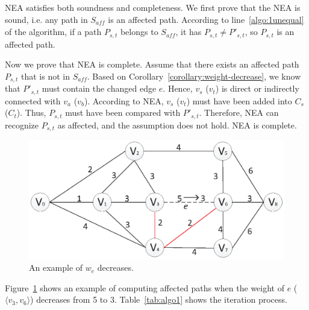 NEA satisfies both soundness and completeness. We first prove that the NEA is sound, i.e. any path in $S_\textit{aff}$ is an affected path. According to line~\ref{algo:1unequal} of the algorithm, if a path $P_{s,t}$ belongs to $S_\textit{aff}$, it has $P_{s,t} \neq P'_{s,t}$, so $P_{s,t}$ is an affected path.

Now we prove that NEA is complete. Assume that there exists an affected path $P_{s,t}$ that is not in $S_\textit{aff}$.
Based on Corollary~\ref{corollary:weight-decrease}, we know that $P'_{s,t}$ must contain the changed edge $e$. Hence, $v_s$ ($v_t$) is direct or indirectly connected with $v_a$ ($v_b$). According to NEA, $v_s$ ($v_t$) must have been added into $C_s$ ($C_t$).
Thus, $P_{s,t}$ must have been compared with $P'_{s,t}$.
Therefore, NEA can recognize $P_{s,t}$ as affected, and the assumption does not hold.
NEA is complete.

\begin{figure}[htbp]
\centering
\includegraphics[scale=0.5]{figure/decrease.eps}
    \caption{An example of $w_e$ decreases.}
    \label{fig:decrease_example}
\end{figure}


Figure~\ref{fig:decrease_example} shows an example of computing affected paths when the weight of $e$ ($\langle v_3, v_6\rangle$) decreases from 5 to 3. Table~\ref{tab:algo1} shows the iteration process.

